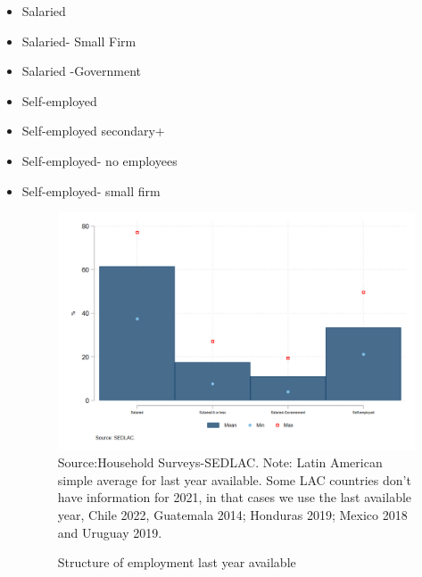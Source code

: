 \documentclass[english]{article}
\begin{document}
\begin{itemize}
    \begin{itemize}
        \item Salaried
        \item Salaried- Small Firm
        \item Salaried -Government
        \item Self-employed 
        \item Self-employed secondary+
        \item Self-employed- no employees
        \item Self-employed- small firm
        \begin{figure}[!htb]
        \centering
        \caption{Structure of employment last year available}     
        \includegraphics[scale=.3]{latex/figures/Snapshot/Structure of employment.png}
        \label{fig:employment}
        \footnotesize{Source:Household Surveys-SEDLAC.}
        \footnotesize{Note: Latin American simple average for last year available. Some LAC countries don’t have information for 2021, in that cases we use the last available year, Chile 2022, Guatemala 2014; Honduras 2019; Mexico 2018 and Uruguay 2019.}
        \end{figure}
         
         \begin{figure}[!htb]


\end{figure}
\end{itemize}
\end{itemize}
\end{document}

